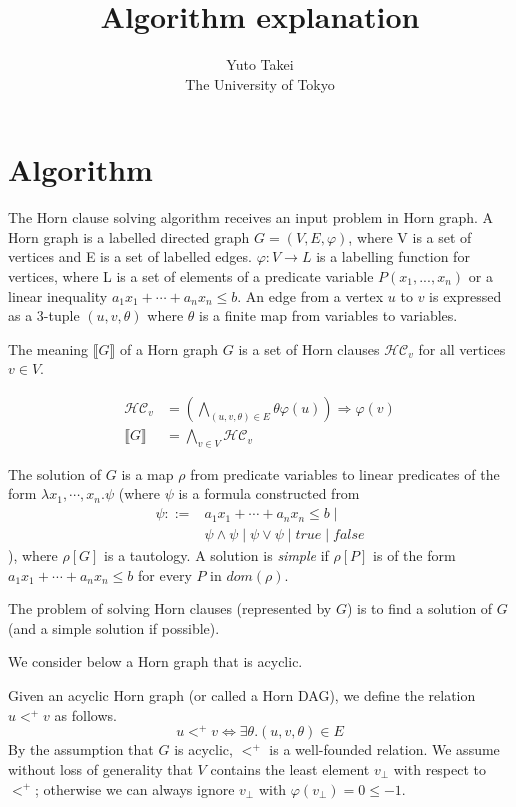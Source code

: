 \documentclass[a4paper,12pt]{article}
\title{Algorithm explanation}
\author{Yuto Takei \\ The University of Tokyo}
\begin{document}
\maketitle

\section{Algorithm}

The Horn clause solving algorithm receives an input problem in Horn
graph. A Horn graph is a labelled directed graph $G=(V,E,\varphi)$,
where V is a set of vertices and E is a set of labelled
edges. $\varphi: V \rightarrow L$ is a labelling function for
vertices, where L is a set of elements of a predicate variable $P(x_1,
..., x_n)$ or a linear inequality $a_1 x_1 + \cdots + a_n x_n \leq b$.
An edge from a vertex $u$ to $v$ is expressed as a 3-tuple
$(u,v,\theta)$ where $\theta$ is a finite map from variables to
variables.

The meaning $\llbracket G \rrbracket $ of a Horn graph $G$ is a set of
Horn clauses $\mathcal{HC}_v$ for all vertices $v \in V$.

\begin{align*}
\mathcal{HC}_v & = \left( \bigwedge_{(u,v,\theta) \in E} \theta \varphi(u) \right) \Longrightarrow \varphi(v) \\
\llbracket G \rrbracket & = \bigwedge_{v \in V} \mathcal{HC}_v
\end{align*}

The solution of $G$ is a map $\rho$ from predicate variables to linear
predicates of the form $\lambda x_1, \cdots ,x_n. \psi $ (where $\psi$
is a formula constructed from
\begin{align*}
\psi ::= & a_1 x_1 + \cdots + a_n x_n \leq b \mid \\
& \psi \wedge \psi \mid \psi \vee \psi \mid true \mid false
\end{align*}
), where $\rho[G]$ is a tautology. A solution is \textit{simple} if
$\rho[P]$ is of the form $a_1 x_1 + \cdots + a_n x_n \leq b$ for every
$P$ in $dom(\rho)$.

The problem of solving Horn clauses (represented by $G$) is to find a
solution of $G$ (and a simple solution if possible).

We consider below a Horn graph that is acyclic.

Given an acyclic Horn graph (or called a Horn DAG), we define the
relation $u <^+ v$ as follows.
\[ u <^+ v \Longleftrightarrow \exists \theta. (u,v,\theta) \in E \]
By the assumption that $G$ is acyclic, $<^+$ is a well-founded
relation. We assume without loss of generality that $V$ contains the
least element $v_\bot$ with respect to $<^+$; otherwise we can always
ignore $v_\bot$ with $\varphi(v_\bot) = 0 \leq -1$.
\end{document}
